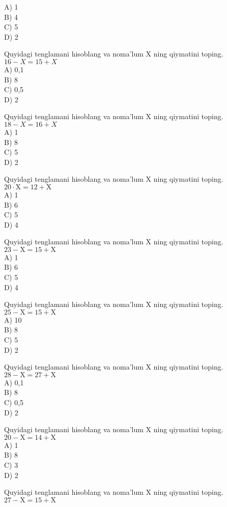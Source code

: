 A) 1\\
B) 4\\
C) 5\\
D) 2
  \item Quyidagi tenglamani hisoblang va noma'lum X ning qiymatini toping. $16-X=15+X$\\
A) 0,1\\
B) 8\\
C) 0,5\\
D) 2
  \item Quyidagi tenglamani hisoblang va noma'lum X ning qiymatini toping.\\
$18-X=16+X$\\
A) 1\\
B) 8\\
C) 5\\
D) 2
  \item Quyidagi tenglamani hisoblang va noma'lum X ning qiymatini toping.\\
$20 \cdot \mathrm{X}=12+\mathrm{X}$\\
A) 1\\
B) 6\\
C) 5\\
D) 4
  \item Quyidagi tenglamani hisoblang va noma'lum X ning qiymatini toping. $23-\mathrm{X}=15+\mathrm{X}$\\
A) 1\\
B) 6\\
C) 5\\
D) 4
  \item Quyidagi tenglamani hisoblang va noma'lum X ning qiymatini toping. $25-\mathrm{X}=15+\mathrm{X}$\\
A) 10\\
B) 8\\
C) 5\\
D) 2
  \item Quyidagi tenglamani hisoblang va noma'lum X ning qiymatini toping. $28-\mathrm{X}=27+\mathrm{X}$\\
A) 0,1\\
B) 8\\
C) 0,5\\
D) 2
  \item Quyidagi tenglamani hisoblang va noma'lum X ning qiymatini toping. $20-\mathrm{X}=14+\mathrm{X}$\\
A) 1\\
B) 8\\
C) 3\\
D) 2
  \item Quyidagi tenglamani hisoblang va noma'lum X ning qiymatini toping. $27-\mathrm{X}=15+\mathrm{X}$\\
